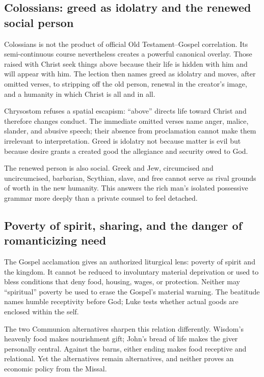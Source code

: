 \subsection*{Colossians: greed as idolatry and the renewed social person}

Colossians is not the product of official Old Testament--Gospel correlation.
Its semi-continuous course nevertheless creates a powerful canonical overlay.
Those raised with Christ seek things above because their life is hidden with
him and will appear with him. The lection then names greed as idolatry and
moves, after omitted verses, to stripping off the old person, renewal in the
creator's image, and a humanity in which Christ is all and in all.

Chrysostom refuses a spatial escapism: “above” directs life toward Christ and
therefore changes conduct. The immediate omitted verses name anger, malice,
slander, and abusive speech; their absence from proclamation cannot make them
irrelevant to interpretation. Greed is idolatry not because matter is evil but
because desire grants a created good the allegiance and security owed to God.

The renewed person is also social. Greek and Jew, circumcised and
uncircumcised, barbarian, Scythian, slave, and free cannot serve as rival
grounds of worth in the new humanity. This answers the rich man's isolated
possessive grammar more deeply than a private counsel to feel detached.

\subsection*{Poverty of spirit, sharing, and the danger of romanticizing need}

The Gospel acclamation gives an authorized liturgical lens: poverty of spirit
and the kingdom. It cannot be reduced to involuntary material deprivation or
used to bless conditions that deny food, housing, wages, or protection.
Neither may “spiritual” poverty be used to erase the Gospel's material
warning. The beatitude names humble receptivity before God; Luke tests whether
actual goods are enclosed within the self.

The two Communion alternatives sharpen this relation differently. Wisdom's
heavenly food makes nourishment gift; John's bread of life makes the giver
personally central. Against the barns, either ending makes food receptive and
relational. Yet the alternatives remain alternatives, and neither proves an
economic policy from the Missal.

